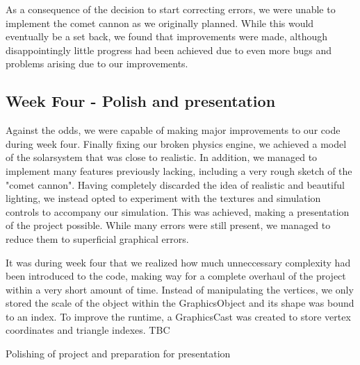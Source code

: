 As a consequence of the decision to start correcting errors, we were unable to implement the comet cannon as we originally planned. While this would eventually be a set back, we found that improvements were made, although disappointingly little progress had been achieved due to even more bugs and problems arising due to our improvements.

\subsection{Week Four - Polish and presentation}
Against the odds, we were capable of making major improvements to our code during week four. Finally fixing our broken physics engine, we achieved a model of the solarsystem that was close to realistic. In addition, we managed to implement many features previously lacking, including a very rough sketch of the "comet cannon". Having completely discarded the idea of realistic and beautiful lighting, we instead opted to experiment with the textures and simulation controls to accompany our simulation. This was achieved, making a presentation of the project possible. While many errors were still present, we managed to reduce them to superficial graphical errors.

It was during week four that we realized how much unneccessary complexity had been introduced to the code, making way for a complete overhaul of the project within a very short amount of time. Instead of manipulating the vertices, we only stored the scale of the object within the GraphicsObject and its shape was bound to an index. To improve the runtime, a GraphicsCast was created to store vertex coordinates and triangle indexes. TBC

Polishing of project and preparation for presentation
\textsl{}